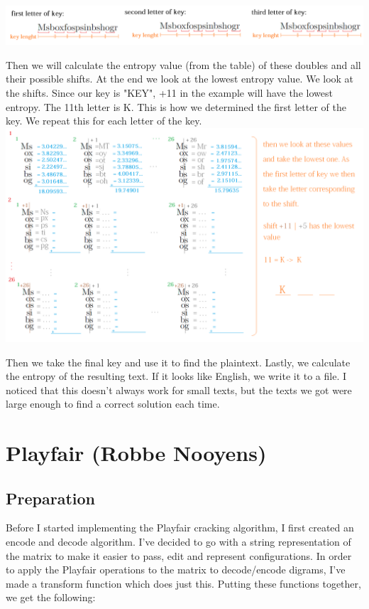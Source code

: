 \documentclass{article}
\begin{document}
\includegraphics[scale=0.60]{image1.png}

\newpage

Then we will calculate the entropy value (from the table) of these doubles and all their possible shifts. At the end we look at the lowest entropy value. We look at the shifts. Since our key is "KEY", +11 in the example will have the lowest entropy. The 11th letter is K. This is how we determined the first letter of the key. We repeat this for each letter of the key.\\

\includegraphics[scale=0.60]{image2.png}

Then we take the final key and use it to find the plaintext. Lastly, we calculate the entropy of the resulting text. If it looks like English, we write it to a file. I noticed that this doesn't always work for small texts, but the texts we got were large enough to find a correct solution each time.

\section{Playfair (Robbe Nooyens)}

\subsection{Preparation}
Before I started implementing the Playfair cracking algorithm, I first created an encode and decode algorithm. I've decided to go with a string representation of the matrix to make it easier to pass, edit and represent configurations. In order to apply the Playfair operations to the matrix to decode/encode digrams, I've made a transform function which does just this. Putting these functions together, we get the following:
\end{document}
